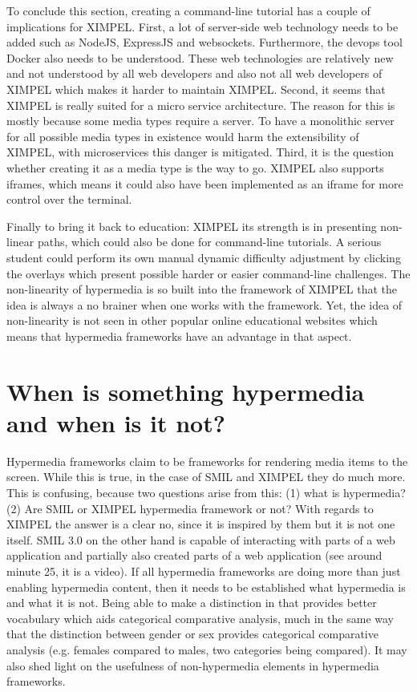 To conclude this section, creating a command-line tutorial has a couple of implications for XIMPEL. First, a lot of server-side web technology needs to be added such as NodeJS, ExpressJS and websockets. Furthermore, the devops tool Docker also needs to be understood. These web technologies are relatively new and not understood by all web developers and also not all web developers of XIMPEL which makes it harder to maintain XIMPEL. Second, it seems that XIMPEL is really suited for a micro service architecture. The reason for this is mostly because some media types require a server. To have a monolithic server for all possible media types in existence would harm the extensibility of XIMPEL, with microservices this danger is mitigated. Third, it is the question whether creating it as a media type is the way to go. XIMPEL also supports iframes, which means it could also have been implemented as an iframe for more control over the terminal. 

Finally to bring it back to education: XIMPEL its strength is in presenting non-linear paths, which could also be done for command-line tutorials. A serious student could perform its own manual dynamic difficulty adjustment by clicking the overlays which present possible harder or easier command-line challenges. The non-linearity of hypermedia is so built into the framework of XIMPEL that the idea is always a no brainer when one works with the framework. Yet, the idea of non-linearity is not seen in other popular online educational websites which means that hypermedia frameworks have an advantage in that aspect. 

\section{When is something hypermedia and when is it not?}
Hypermedia frameworks claim to be frameworks for rendering media items to the screen. While this is true, in the case of SMIL and XIMPEL they do much more. This is confusing, because two questions arise from this: (1) what is hypermedia? (2) Are SMIL or XIMPEL hypermedia framework or not? With regards to XIMPEL the answer is a clear no, since it is inspired by them but it is not one itself. SMIL 3.0 on the other hand is capable of interacting with parts of a web application and partially also created parts of a web application (see \cite{SMIL_lecture} around minute 25, it is a video). If all hypermedia frameworks are doing more than just enabling hypermedia content, then it needs to be established what hypermedia is and what it is not. Being able to make a distinction in that provides better vocabulary which aids categorical comparative analysis, much in the same way that the distinction between gender or sex provides categorical comparative analysis (e.g. females compared to males, two categories being compared). It may also shed light on the usefulness of non-hypermedia elements in hypermedia frameworks.

